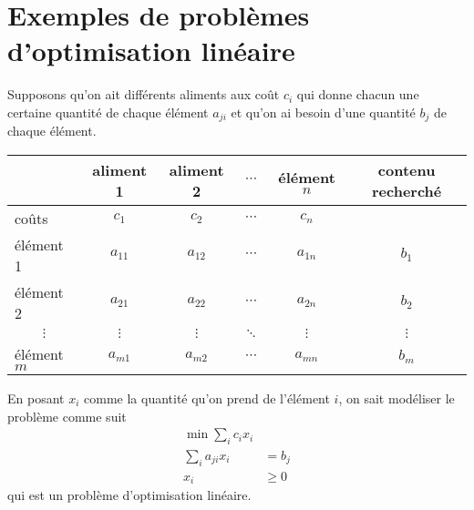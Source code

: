
\annexe

\section{Exemples de problèmes d'optimisation linéaire}
\begin{myexem}
  Supposons qu'on ait différents aliments aux coût $c_i$
  qui donne chacun une certaine quantité de chaque élément $a_{ji}$ et
  qu'on ai besoin d'une quantité $b_j$ de chaque élément.
  \begin{center}
    \begin{tabular}{|l|c|c|c|c|c|}
      \hline
      & aliment 1 & aliment 2 & $\cdots$ & élément $n$ & contenu recherché\\
      \hline
      coûts & $c_1$ & $c_2$ & $\cdots$ & $c_n$ & \\
      \hline
      élément 1 & $a_{11}$ & $a_{12}$ & $\cdots$ & $a_{1n}$ & $b_1$\\
      \hline
      élément 2 & $a_{21}$ & $a_{22}$ & $\cdots$ & $a_{2n}$ & $b_2$\\
      \hline
      \multicolumn{1}{|c|}{$\vdots$} & $\vdots$ & $\vdots$
      & $\ddots$ & $\vdots$ & $\vdots$\\
      \hline
      élément $m$ & $a_{m1}$ & $a_{m2}$ & $\cdots$ & $a_{mn}$ & $b_m$\\
      \hline
    \end{tabular}
  \end{center}
  En posant $x_i$ comme la quantité qu'on prend de l'élément $i$,
  on sait modéliser le problème comme suit
  \begin{align*}
    \min \sum_i c_i x_i\\
    \sum_i a_{ji} x_i & = b_j\\
    x_i & \geq 0
  \end{align*}
  qui est un problème d'optimisation linéaire.
\end{myexem}

